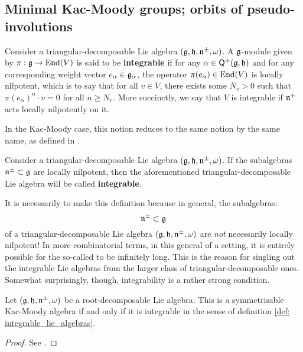     \subsection{Minimal Kac-Moody groups; orbits of pseudo-involutions}
        \begin{definition} \label{def: integrable_modules_over_triangular_decomposable_lie_algebras}
            Consider a triangular-decomposable Lie algebra $(\mathfrak{g}, \mathfrak{h}, \mathfrak{n}^{\pm}, \omega)$. A $\mathfrak{g}$-module given by $\pi: \mathfrak{g} \to \operatorname{End}(V)$ is said to be \textbf{integrable} if for any $\alpha \in \mathsf{Q}^+(\mathfrak{g}, \mathfrak{h})$ and for any corresponding weight vector $e_{\alpha} \in \mathfrak{g}_{\alpha}$, the operator $\pi(e_{\alpha}) \in \operatorname{End}(V)$ is locally nilpotent, which is to say that for all $v \in V$, there exists some $N_v > 0$ such that $\pi(e_{\alpha})^n \cdot v = 0$ for all $n \geq N_v$. More succinctly, we say that $V$ is integrable if $\mathfrak{n}^+$ acts locally nilpotently on it.
        \end{definition}
        In the Kac-Moody case, this notion reduces to the same notion by the same name, as defined in \cite[Chapter 3]{kac_infinite_dimensional_lie_algebras}.
        \begin{definition} \label{def: integrable_lie_algebras}
            Consider a triangular-decomposable Lie algebra $(\mathfrak{g}, \mathfrak{h}, \mathfrak{n}^{\pm}, \omega)$. If the subalgebras $\mathfrak{n}^{\pm} \subset \mathfrak{g}$ are locally nilpotent, then the aforementioned triangular-decomposable Lie algebra will be called \textbf{integrable}.
        \end{definition}
        It is necessarily to make this definition because in general, the  subalgebras:
            $$\mathfrak{n}^{\pm} \subset \mathfrak{g}$$
        of a triangular-decomposable Lie algebra $(\mathfrak{g}, \mathfrak{h}, \mathfrak{n}^{\pm}, \omega)$ are \textit{not} necessarily locally nilpotent! In more combinatorial terms, in this general of a setting, it is entirely possible for the so-called  to be infinitely long. This is the reason for singling out the integrable Lie algebras from the larger class of triangular-decomposable ones. Somewhat surprisingly, though, integrability is a rather strong condition.
        \begin{lemma} \label{lemma: integrable_root_decomposable_lie_algebras_are_symmetrisable_kac_moody_algebras}
            Let $(\mathfrak{g}, \mathfrak{h}, \mathfrak{n}^{\pm}, \omega)$ be a root-decomposable Lie algebra. This is a symmetrisable Kac-Moody algebra if and only if it is integrable in the sense of definition \ref{def: integrable_lie_algebras}.
        \end{lemma}
            \begin{proof}
                See \cite[Propsition 4.1.11]{moody_pianzola_lie_algebras_with_triangular_decompositions}.
            \end{proof}

